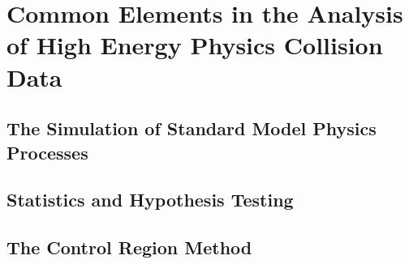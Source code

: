 \chapter{Common Elements in the Analysis of High Energy Physics Collision Data}
\label{chap:common_search}

\section{The Simulation of Standard Model Physics Processes}

\section{Statistics and Hypothesis Testing}

\section{The Control Region Method}
